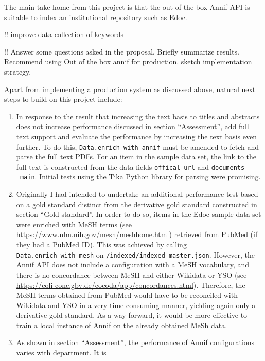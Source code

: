 The main take home from this project is that the out of the box Annif
API is suitable to index an institutional repository such as Edoc.

!! improve data collection of keywords

!! Answer some questions asked in the proposal. Briefly summarize
results. Recommend using Out of the box annif for production. sketch
implementation strategy.

Apart from implementing a production system as discussed above, natural
next steps to build on this project include:

\begin{enumerate}
\def\labelenumi{\arabic{enumi}.}
\item
  In response to the result that increasing the text basis to titles and
  abstracts does not increase performance discussed in
  \protect\hyperlink{assessment}{section ``Assessment''}, add full text
  support and evaluate the performance by increasing the text basis even
  further. To do this, \texttt{Data.enrich\_with\_annif} must be amended
  to fetch and parse the full text PDFs. For an item in the sample data
  set, the link to the full text is constructed from the data fields
  \texttt{offical\ url} and \texttt{documents\ -\ main}. Initial tests
  using the Tika Python library for parsing were promising.
\item
  Originally I had intended to undertake an additional performance test
  based on a gold standard distinct from the derivative gold standard
  constructed in \protect\hyperlink{gold-standard}{section ``Gold
  standard''}. In order to do so, items in the Edoc sample data set were
  enriched with MeSH terms (see
  \url{https://www.nlm.nih.gov/mesh/meshhome.html}) retrieved from
  PubMed (if they had a PubMed ID). This was achieved by calling
  \texttt{Data.enrich\_with\_mesh} on
  \texttt{/indexed/indexed\_master.json}. However, the Annif API does
  not include a configuration with a MeSH vocabulary, and there is no
  concordance between MeSH and either Wikidata or YSO (see
  \url{https://coli-conc.gbv.de/cocoda/app/concordances.html}).
  Therefore, the MeSH terms obtained from PubMed would have to be
  reconciled with Wikidata and YSO in a very time-consuming manner,
  yielding again only a derivative gold standard. As a way forward, it
  would be more effective to train a local instance of Annif on the
  already obtained MeSh data.
\item
  As shown in \protect\hyperlink{assessment}{section ``Assessment''},
  the performance of Annif configurations varies with department. It is

\end{enumerate}
